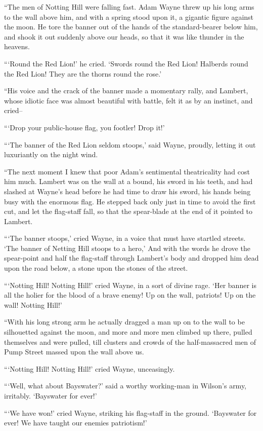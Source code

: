 \documentclass{book}
\begin{document}
“The men of Notting Hill were falling fast. Adam Wayne threw up his long arms to the wall above him, and with a spring stood upon it, a gigantic figure against the moon. He tore the banner out of the hands of the standard-bearer below him, and shook it out suddenly above our heads, so that it was like thunder in the heavens.

“‘Round the Red Lion!’ he cried. ‘Swords round the Red Lion! Halberds round the Red Lion! They are the thorns round the rose.’

“His voice and the crack of the banner made a momentary rally, and Lambert, whose idiotic face was almost beautiful with battle, felt it as by an instinct, and cried–

“‘Drop your public-house flag, you footler! Drop it!’

“‘The banner of the Red Lion seldom stoops,’ said Wayne, proudly, letting it out luxuriantly on the night wind.

“The next moment I knew that poor Adam’s sentimental theatricality had cost him much. Lambert was on the wall at a bound, his sword in his teeth, and had slashed at Wayne’s head before he had time to draw his sword, his hands being busy with the enormous flag. He stepped back only just in time to avoid the first cut, and let the flag-staff fall, so that the spear-blade at the end of it pointed to Lambert.

“‘The banner stoops,’ cried Wayne, in a voice that must have startled streets. ‘The banner of Netting Hill stoops to a hero,’ And with the words he drove the spear-point and half the flag-staff through Lambert’s body and dropped him dead upon the road below, a stone upon the stones of the street.

“‘Notting Hill! Notting Hill!’ cried Wayne, in a sort of divine rage. ‘Her banner is all the holier for the blood of a brave enemy! Up on the wall, patriots! Up on the wall! Notting Hill!’

“With his long strong arm he actually dragged a man up on to the wall to be silhouetted against the moon, and more and more men climbed up there, pulled themselves and were pulled, till clusters and crowds of the half-massacred men of Pump Street massed upon the wall above us.

“‘Notting Hill! Notting Hill!’ cried Wayne, unceasingly.

“‘Well, what about Bayswater?’ said a worthy working-man in Wilson’s army, irritably. ‘Bayswater for ever!’

“‘We have won!’ cried Wayne, striking his flag-staff in the ground. ‘Bayswater for ever! We have taught our enemies patriotism!’
\end{document}
